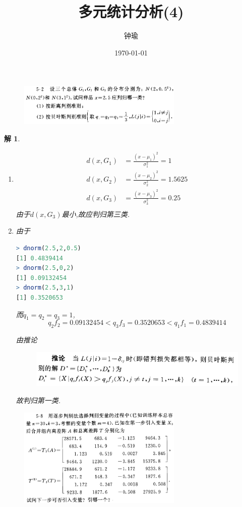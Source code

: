 \documentclass[11pt,a4paper]{ctexart}
\title{多元统计分析(4)}
\author{钟瑜 \quad 222018314210044}
\date{\today}
\newtheorem*{solution}{解}
\begin{document}
	\maketitle
	\pagestyle{plain}%
\begin{figure}[H]
	\includegraphics[width=0.7\textwidth]{screenshot001}
\end{figure}
\begin{solution}
\begin{enumerate}
	\item[(1)] 
	\begin{equation}
		\begin{aligned}
			d(x,G_1)&=\frac{(x-\mu_1)^2}{\sigma_1^2}=1\\
			d(x,G_2)&=\frac{(x-\mu_2)^2}{\sigma_2^2}=1.5625\\
			d(x,G_3)&=\frac{(x-\mu_3)^2}{\sigma_3^2}=0.25\\
		\end{aligned}
	\end{equation}
由于$ d(x,G_3) $最小,故应判归第三类.
	\item[(2)] 由于
\begin{lstlisting}[language=r]
> dnorm(2.5,2,0.5)
[1] 0.4839414
> dnorm(2.5,0,2)
[1] 0.09132454
> dnorm(2.5,3,1)
[1] 0.3520653
\end{lstlisting}

而$ q_1=q_2=q_3=1 $,$$ q_2f_2=0.09132454<q_3f_3=0.3520653<q_1f_1=0.4839414$$

由推论
\begin{figure}[H]
	\centering
	\includegraphics[width=0.7\linewidth]{screenshot007}
\end{figure}
故判归第一类.
\end{enumerate}
\end{solution}
\begin{figure}[H]
	\includegraphics[width=0.7\textwidth]{screenshot002}
\end{figure}
\end{document}
